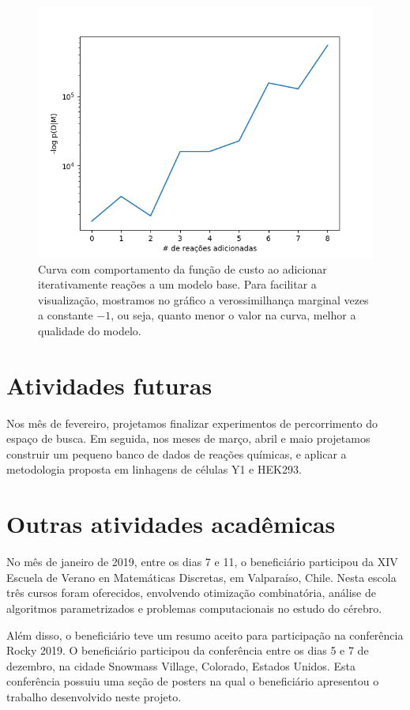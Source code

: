 \documentclass[12pt]{article}
\begin{document}
\begin{figure}
    \includegraphics[clip=true]{experiments/surface_curve.png}
    \caption{Curva com comportamento da função de custo ao adicionar
    iterativamente reações a um modelo base. Para facilitar a
    visualização, mostramos no gráfico a verossimilhança marginal vezes 
    a constante $-1$, ou seja, quanto menor o valor na curva, melhor a
    qualidade do modelo. 
    }
    \label{fig:random_walk}
\end{figure}

\section{Atividades futuras}
Nos mês de fevereiro, projetamos finalizar experimentos de percorrimento
do espaço de busca. Em seguida, nos meses de março, abril e maio
projetamos construir um pequeno banco de dados de reações químicas,
e aplicar a metodologia proposta em linhagens de células Y1 e HEK293.

\section{Outras atividades acadêmicas}
No mês de janeiro de 2019, entre os dias 7 e 11, o beneficiário 
participou da XIV Escuela de Verano en Matemáticas Discretas, em 
Valparaíso, Chile. Nesta escola três cursos foram oferecidos, envolvendo
otimização combinatória, análise de algoritmos parametrizados e
problemas computacionais no estudo do cérebro.

Além disso, o beneficiário teve um resumo aceito para participação na
conferência Rocky 2019. O beneficiário participou da conferência entre
os dias 5 e 7 de dezembro, na cidade Snowmass Village, Colorado, Estados
Unidos. Esta conferência possuiu uma seção de posters na qual o
beneficiário apresentou o trabalho desenvolvido neste projeto.

 

\end{document}
